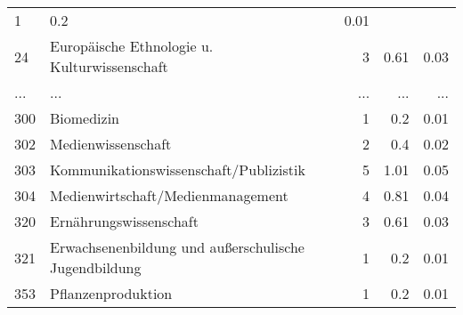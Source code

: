 \begin{longtable}{lXrrr}
          \num{1} &
          \num[round-mode=places,round-precision=2]{0.2} &
          \num[round-mode=places,round-precision=2]{0.01} \\
        24 & \multicolumn{1}{X}{Europäische Ethnologie u. Kulturwissenschaft} & %
          \num{3} &
          \num[round-mode=places,round-precision=2]{0.61} &
          \num[round-mode=places,round-precision=2]{0.03} \\
       ... & ... & ... & ... & ... \\
        300 & \multicolumn{1}{X}{Biomedizin} & %
          \num{1} &
          \num[round-mode=places,round-precision=2]{0.2} &
          \num[round-mode=places,round-precision=2]{0.01} \\

        302 & \multicolumn{1}{X}{Medienwissenschaft} & %
          \num{2} &
          \num[round-mode=places,round-precision=2]{0.4} &
          \num[round-mode=places,round-precision=2]{0.02} \\

        303 & \multicolumn{1}{X}{Kommunikationswissenschaft/Publizistik} & %
          \num{5} &
          \num[round-mode=places,round-precision=2]{1.01} &
          \num[round-mode=places,round-precision=2]{0.05} \\

        304 & \multicolumn{1}{X}{Medienwirtschaft/Medienmanagement} & %
          \num{4} &
          \num[round-mode=places,round-precision=2]{0.81} &
          \num[round-mode=places,round-precision=2]{0.04} \\

        320 & \multicolumn{1}{X}{Ernährungswissenschaft} & %
          \num{3} &
          \num[round-mode=places,round-precision=2]{0.61} &
          \num[round-mode=places,round-precision=2]{0.03} \\

        321 & \multicolumn{1}{X}{Erwachsenenbildung und außerschulische Jugendbildung} & %
          \num{1} &
          \num[round-mode=places,round-precision=2]{0.2} &
          \num[round-mode=places,round-precision=2]{0.01} \\

        353 & \multicolumn{1}{X}{Pflanzenproduktion} & %
          \num{1} &
          \num[round-mode=places,round-precision=2]{0.2} &
          \num[round-mode=places,round-precision=2]{0.01} \\


\end{longtable}

